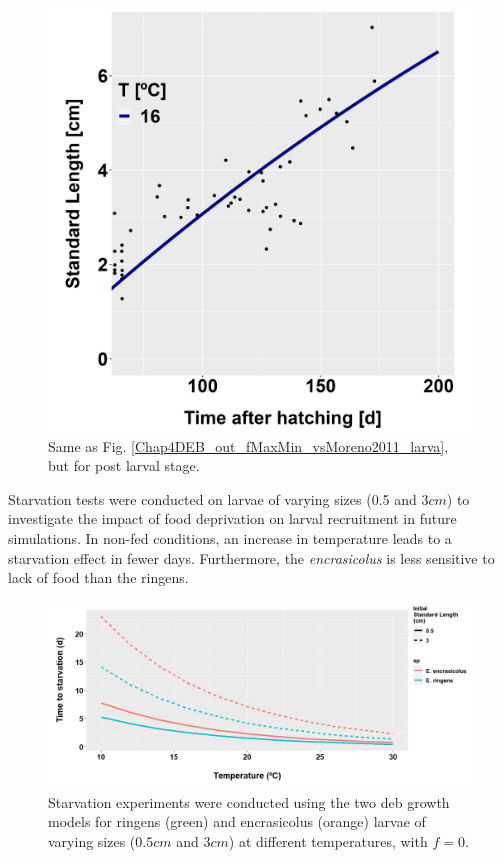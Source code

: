 \begin{figure}[H]
	\includegraphics[width=1.0\textwidth]{figures/Chap4DEB_out_f1vsMoreno2011_adulto.png}
	\centering
	\caption{Same as Fig. \ref{Chap4DEB_out_fMaxMin_vsMoreno2011_larva}, but for post larval stage.}
	\label{Chap4DEB_out_f1vsMoreno2011_adulto}
\end{figure}

Starvation tests were conducted on larvae of varying sizes (0.5 and $3 cm$) to investigate the impact of food deprivation on larval recruitment in future simulations. In non-fed conditions, an increase in temperature leads to a starvation effect in fewer days. Furthermore, the \textit{\gls{encrasicolus}} is less sensitive to lack of food than the \gls{ringens}.\\

\begin{figure}[H]
	\includegraphics[width=1.0\textwidth]{figures/Chap4Starvation_compar.png}
	\centering
	\caption{Starvation experiments were conducted using the two \acrshort{deb} growth models for \gls{ringens} (green) and \gls{encrasicolus} (orange) larvae of varying sizes ($0.5 cm$ and $3 cm$) at different temperatures, with $f = 0$.}
	\label{Chap4Starvation_compar}
\end{figure}
%

